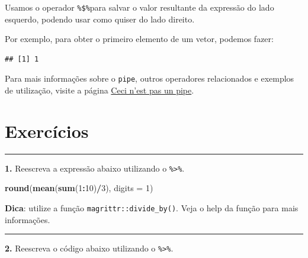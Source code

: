\documentclass[
]{book}
\newenvironment{Shaded}{\begin{snugshade}}{\end{snugshade}}
\newcommand{\DataTypeTok}[1]{\textcolor[rgb]{0.13,0.29,0.53}{#1}}
\newcommand{\DecValTok}[1]{\textcolor[rgb]{0.00,0.00,0.81}{#1}}
\newcommand{\KeywordTok}[1]{\textcolor[rgb]{0.13,0.29,0.53}{\textbf{#1}}}
\newcommand{\NormalTok}[1]{#1}
\newcommand{\OperatorTok}[1]{\textcolor[rgb]{0.81,0.36,0.00}{\textbf{#1}}}
\newcommand{\StringTok}[1]{\textcolor[rgb]{0.31,0.60,0.02}{#1}}
\begin{document}
Usamos o operador \texttt{\%\$\%}para salvar o valor resultante da expressão do lado esquerdo, podendo usar como quiser do lado direito.

Por exemplo, para obter o primeiro elemento de um vetor, podemos fazer:

\begin{Shaded}
\end{Shaded}

\begin{verbatim}
## [1] 1
\end{verbatim}

Para mais informações sobre o \texttt{pipe}, outros operadores relacionados e exemplos de utilização, visite a página \href{http://cran.r-project.org/web/packages/magrittr/vignettes/magrittr.html}{Ceci n'est pas un pipe}.

\hypertarget{exercuxedcios-1}{%
\section{Exercícios}\label{exercuxedcios-1}}

\begin{center}\rule{0.5\linewidth}{0.5pt}\end{center}

\textbf{1.} Reescreva a expressão abaixo utilizando o \texttt{\%\textgreater{}\%}.

\begin{Shaded}
\begin{Highlighting}[]
\KeywordTok{round}\NormalTok{(}\KeywordTok{mean}\NormalTok{(}\KeywordTok{sum}\NormalTok{(}\DecValTok{1}\OperatorTok{:}\DecValTok{10}\NormalTok{)}\OperatorTok{/}\DecValTok{3}\NormalTok{), }\DataTypeTok{digits =} \DecValTok{1}\NormalTok{)}
\end{Highlighting}
\end{Shaded}

\textbf{Dica}: utilize a função \texttt{magrittr::divide\_by()}. Veja o help da função para mais informações.

\begin{center}\rule{0.5\linewidth}{0.5pt}\end{center}

\textbf{2.} Reescreva o código abaixo utilizando o \texttt{\%\textgreater{}\%}.
\end{document}
